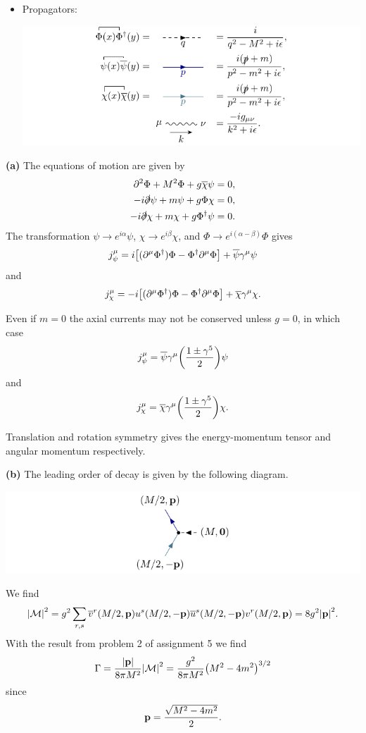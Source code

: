 \documentclass{article}
\makeatletter
\newcommand*{\shifttext}[1]{%
  \settowidth{\@tempdima}{#1}%
  \hspace{-\@tempdima}#1%
}
\newcommand{\plabel}[1]{%
\shifttext{\textbf{#1}\quad}%
}
\makeatother
\begin{document}
\begin{itemize}
\begin{center}
    \end{center}
    \item Propagators:
    \begin{center}
        \includegraphics{img/propagator/propagator.pdf}
    \end{center}
\end{itemize}

% 
% 

\plabel{(a)}%
The equations of motion are given by
\begin{align*}
    \partial^2 \Phi + M^2 \Phi + g\overline{\chi} \psi &= 0, \\
    -i\slashed{\partial} \psi + m\psi + g\Phi\chi &= 0, \\
    -i\slashed{\partial} \chi + m\chi + g\Phi^\dagger \psi &= 0.
\end{align*}
The transformation $\psi \rightarrow e^{i\alpha}\psi$, $\chi \rightarrow e^{i\beta}\chi$, and $\Phi \rightarrow e^{i(\alpha - \beta)} \Phi$ gives
\[ j^\mu_\psi = i\qty[(\partial^\mu \Phi^\dagger)\Phi - \Phi^\dagger \partial^\mu \Phi] + \overline{\psi} \gamma^\mu \psi \]
and
\[ j^\mu_\chi = -i\qty[(\partial^\mu \Phi^\dagger)\Phi - \Phi^\dagger \partial^\mu \Phi] + \overline{\chi} \gamma^\mu \chi. \]

Even if $m=0$ the axial currents may not be conserved unless $g=0$, in which case
\[ j^\mu_\psi = \overline{\psi} \gamma^\mu \qty(\frac{1\pm \gamma^5}{2}) \psi \]
and
\[ j^\mu_\chi = \overline{\chi} \gamma^\mu \qty(\frac{1\pm \gamma^5}{2}) \chi. \]

Translation and rotation symmetry gives the energy-momentum tensor and angular momentum respectively.

\plabel{(b)}%
The leading order of decay is given by the following diagram.
\begin{center}
    \includegraphics{img/decay/decay.pdf}
\end{center}
We find
\[ \abs{\mathcal{M}}^2 = g^2 \sum_{r,s} \overline{v}^r(M/2,\vb{p}) {u}^s(M/2,-\vb{p})\overline{u}^s(M/2,-\vb{p}) {v}^r(M/2,\vb{p}) = 8 g^2 \abs{\vb{p}}^2. \]
With the result from problem 2 of assignment 5 we find
\[ \Gamma = \frac{\abs{\vb{p}}}{8\pi M^2} \abs{\mathcal{M}}^2 = \frac{g^2}{8\pi M^2}\qty(M^2 - 4m^2)^{3/2} \]
since
\[ \vb{p} = \frac{\sqrt{M^2 - 4m^2}}{2}. \]
\end{document}
